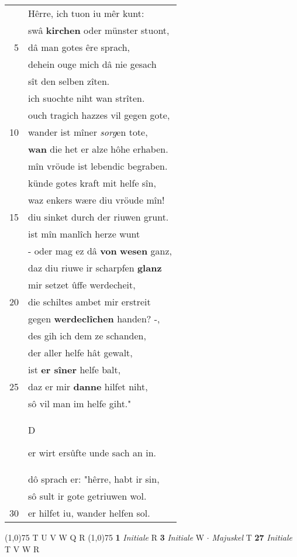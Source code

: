 \documentclass[8pt,a4paper,notitlepage]{article}
\begin{document}
\begin{table}[ht]
\begin{minipage}[t]{0.5\linewidth}
\begin{tabular}{rl}
 & Hêrre, ich tuon iu mêr kunt:\\ 
 & swâ \textbf{kirchen} oder münster stuont,\\ 
5 & dâ man gotes êre sprach,\\ 
 & dehein ouge mich dâ nie gesach\\ 
 & sît den selben zîten.\\ 
 & ich suochte niht wan strîten.\\ 
 & ouch tragich hazzes vil gegen gote,\\ 
10 & wander ist mîner \textit{sorg}en tote,\\ 
 & \textbf{wan} die het er alze hôhe erhaben.\\ 
 & mîn vröude ist lebendic begraben.\\ 
 & künde gotes kraft mit helfe sîn,\\ 
 & waz enkers wære diu vröude mîn!\\ 
15 & diu sinket durch der riuwen grunt.\\ 
 & ist mîn manlîch herze wunt\\ 
 & - oder mag ez dâ \textbf{von} \textbf{wesen} ganz,\\ 
 & daz diu riuwe ir scharpfen \textbf{glanz}\\ 
 & mir setzet ûffe werdecheit,\\ 
20 & die schiltes ambet mir erstreit\\ 
 & gegen \textbf{werdeclîchen} handen? -,\\ 
 & des gih ich dem ze schanden,\\ 
 & der aller helfe hât gewalt,\\ 
 & ist \textbf{er sîner} helfe balt,\\ 
25 & daz er mir \textbf{danne} hilfet niht,\\ 
 & sô vil man im helfe giht."\\ 
 & \begin{large}D\end{large}er wirt ersûfte unde sach an in.\\ 
 & dô sprach er: "hêrre, habt ir sin,\\ 
 & sô sult ir gote getriuwen wol.\\ 
30 & er hilfet iu, wander helfen sol.\\ 
\end{tabular}
\scriptsize
\line(1,0){75} \newline
T U V W Q R \newline
\line(1,0){75} \newline
\textbf{1} \textit{Initiale} R  \textbf{3} \textit{Initiale} W   $\cdot$ \textit{Majuskel} T  \textbf{27} \textit{Initiale} T V W R  \newline

\end{minipage}
\end{table}
\end{document}
